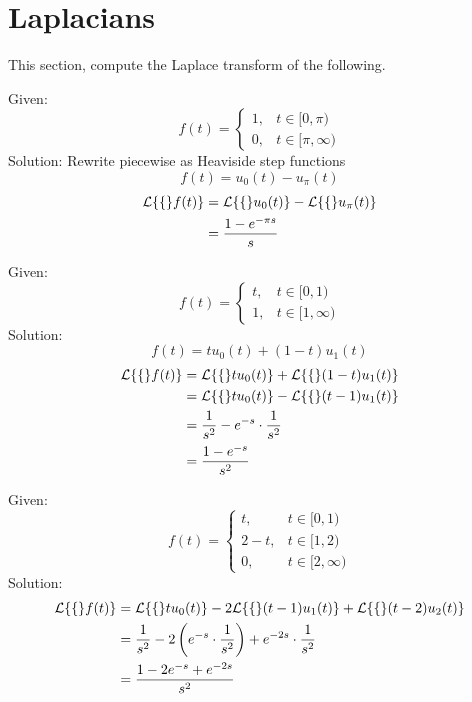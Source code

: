 \documentclass[diffeq.tex]{subfiles}
\begin{document}
\section{Laplacians}
This section, compute the Laplace transform of the following.
\begin{homework*}[247.16]
    Given:
    \begin{equation}
        f(t) = \begin{cases}
            1, &t\in[0, \pi)\\
            0, &t\in[\pi, \infty)
        \end{cases}
    \end{equation}
    Solution:
    Rewrite piecewise as Heaviside step functions
    \begin{equation}
        f(t) = u_{0}(t) - u_{\pi}(t)
    \end{equation}
    \begin{alignat}{1}
        \mathcal{L}\{\{\}f(t)\} &= \mathcal{L}\{\{\}u_{0}(t)\} - \mathcal{L}\{\{\}u_{\pi}(t)\}\\
        &= \frac{1 - e^{-\pi s}}{s}
    \end{alignat}
\end{homework*}
\np
\begin{homework*}[247.17]
    Given:
    \begin{equation}
        f(t) = \begin{cases}
            t, &t\in[0, 1)\\
            1, &t\in[1, \infty)
        \end{cases}
    \end{equation}
    Solution:
    \begin{equation}
        f(t) = tu_{0}(t) + (1 - t)u_{1}(t)
    \end{equation}
    \begin{alignat}{1}
        \mathcal{L}\{\{\}f(t)\} &= \mathcal{L}\{\{\}tu_{0}(t)\} + \mathcal{L}\{\{\}(1 - t)u_{1}(t)\}\\
        &= \mathcal{L}\{\{\}tu_{0}(t)\} - \mathcal{L}\{\{\}(t - 1)u_{1}(t)\}\\
        &= \frac{1}{s^{2}} - e^{-s}\cdot\frac{1}{s^{2}}\\
        &= \frac{1-e^{-s}}{s^{2}}
    \end{alignat}
\end{homework*}
\begin{homework*}[247.18]
    Given:
    \begin{equation}
        f(t) = \begin{cases}
            t, &t\in[0,1)\\
            2-t, &t\in[1,2)\\
            0, &t\in[2,\infty)
        \end{cases}
    \end{equation}
    Solution:
    \begin{alignat}{1}
        \mathcal{L}\{\{\}f(t)\} &= \mathcal{L}\{\{\}tu_{0}(t)\} - 2\mathcal{L}\{\{\}(t - 1)u_{1}(t)\} + \mathcal{L}\{\{\}(t-2)u_{2}(t)\}\\
        &= \frac{1}{s^{2}} - 2\left(e^{-s}\cdot\frac{1}{s^{2}}\right) + e^{-2s}\cdot\frac{1}{s^{2}}\\
        &= \frac{1 - 2e^{-s} + e^{-2s}}{s^{2}}
    \end{alignat}
\end{homework*}
\np
\end{document}
